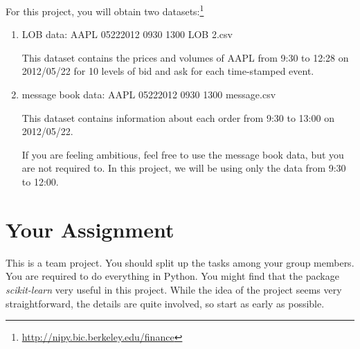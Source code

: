 \documentclass[11pt, oneside]{article}   	%
\begin{document}
For this project, you will obtain two datasets:\footnote{\url{http://nipy.bic.berkeley.edu/finance}} 
\begin{enumerate}
\item LOB data: AAPL 05222012 0930 1300 LOB 2.csv

This dataset contains the prices and volumes of AAPL from 9:30 to 12:28 on 2012/05/22 for 10 levels of bid and ask for each time-stamped event.

\item message book data: AAPL 05222012 0930 1300 message.csv

This dataset contains information about each order from 9:30 to 13:00 on 2012/05/22.

If you are feeling ambitious, feel free to use the message book data, but you are not required to. In this project, we will be using only the data from 9:30 to 12:00.

\end{enumerate}

\section{Your Assignment}

This is a team project. You should split up the tasks among your group members. You are required to do everything in Python. You might find that the package \textit{scikit-learn} very useful in this project. While the idea of the project seems very straightforward, the details are quite involved, so start as early as possible.
\end{document}
